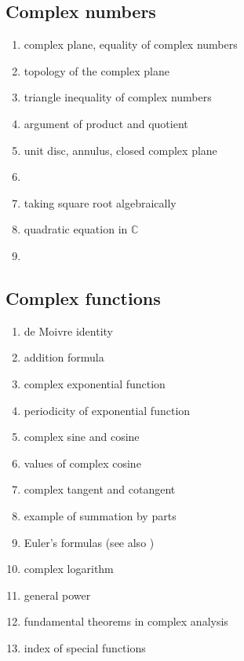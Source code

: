 \documentclass[12pt]{article}
\theoremstyle{definition}
\begin{document}
\subsection{Complex numbers}
\begin{enumerate}
\item complex plane, equality of complex numbers
\item topology of the complex plane
\item triangle inequality of complex numbers
\item argument of product and quotient
\item unit disc, annulus, closed complex plane
\item {}
\item taking square root algebraically
\item quadratic equation in $\mathbb{C}$
\item {}
\end{enumerate}

\subsection{Complex functions}
\begin{enumerate}
\item de Moivre identity
\item addition formula
\item complex exponential function
\item periodicity of exponential function
\item complex sine and cosine
\item values of complex cosine
\item complex tangent and cotangent
\item example of summation by parts
\item Euler's formulas (see also )
\item complex logarithm
\item general power
\item fundamental theorems in complex analysis
\item index of special functions
\end{enumerate}
\end{document}
